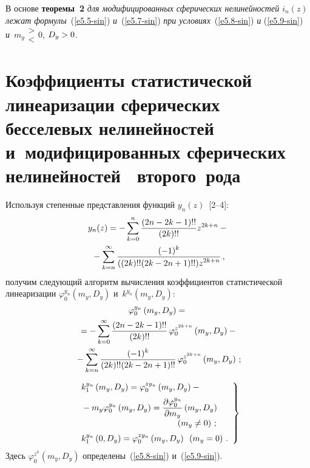 \begin{multicols}{2}
\smallskip

 В основе \textbf{теоремы~2} \textit{для модифицированных сферических 
 нелинейностей $i_n(z)$ лежат формулы}~(\ref{e5.5-sin}) 
 \textit{и}~(\ref{e5.7-sin}) \textit{при условиях}~(\ref{e5.8-sin}) \textit{и} 
 (\ref{e5.9-sin}) \textit{и}~$m_y \begin{matrix} 
 >\\  <\end{matrix}  0$, $D_y \hm>0$.

\section{Коэффициенты статистической линеаризации сферических бесселевых 
нелинейностей~{} и~модифицированных сферических 
нелинейностей~{} второго~рода}

Используя степенные представления функций $y_n (z)$~[2--4]:
    \begin{multline*}
    y_n(z) = -\sss_{k=0}^n \fr{(2n- 2k-1)!!}
    {(2k)!!} z^{2k+n} -{}\\
    {}- \sss_{k=n}^\infty \fr{(-1)^k}{((2k)!!(2k-2n+1)!!)
     z^{2k+n}}\,, %
     \end{multline*}
получим следующий алгоритм вычисления коэффициентов статистической 
линеаризации $\varphi_0^{y_n} (m_y, D_y)$ и~$k^{y_n} (m_y, D_y)$:
  \begin{multline}
  \varphi_0^{y_n} \left(m_y, D_y\right) = {}\\
  {}=
  -\sum\limits_{k=0}^\infty \displaystyle\frac{\displaystyle (2n - 2k-1)!!\mathstrut}{\displaystyle (2k)!!\mathstrut}\,
     \varphi_0^{z^{2k+n}} \left(m_y, D_y\right)-{}\\
     {}-
     \sum\limits_{k=n}^\infty \displaystyle\frac{\displaystyle (-1)^k\mathstrut}{\displaystyle (2k)!! (2k-2n+1)!!\mathstrut}\, 
     \varphi_0^{z^{2k+n}} \left(m_y, D_y\right)\,;
     \label{e6.2-sin}
     \end{multline}
    
    
    \noindent
    \begin{equation}
    \left.
    \begin{array}{l}
    k_1^{y_n} \left(m_y, D_y\right) = \varphi_0^{zy_n}  \left(m_y, D_y\right)- {}\\[6pt]
    {}-
    m_y \varphi_0^{y_n}  \left(m_y, D_y\right) = \fr{\prt \varphi_0^{y_n}}{ \prt m_y}
      \left(m_y, D_y\right) \\[6pt]   
        \hspace*{40mm}\left(m_y \ne 0\right)\,;\\[6pt]
    k_1^{y_n}  \left(0, D_y\right) = \varphi_0^{zy_n}  \left(m_y, D_y\right)\enskip 
    \left(m_y =0\right)\,.
    \end{array}
    \right\}
    \label{e6.3-sin}
    \end{equation}
Здесь $\varphi_0^{z^h}  (m_y, D_y)$ определены~(\ref{e5.8-sin})  и~(\ref{e5.9-sin}).


\end{multicols}
